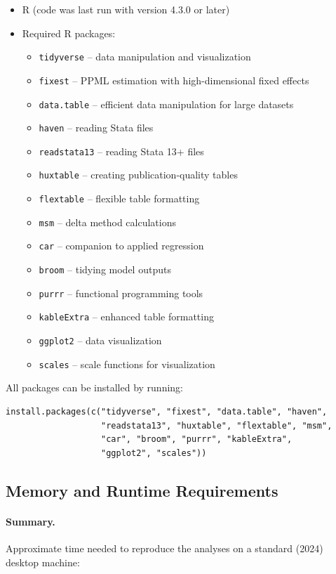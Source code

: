 \documentclass[12pt]{article}
\begin{document}
\begin{itemize}
	\item R (code was last run with version 4.3.0 or later)
	\item Required R packages:
	\begin{itemize}
		\item \texttt{tidyverse} -- data manipulation and visualization
		\item \texttt{fixest} -- PPML estimation with high-dimensional fixed effects
		\item \texttt{data.table} -- efficient data manipulation for large datasets
		\item \texttt{haven} -- reading Stata files
		\item \texttt{readstata13} -- reading Stata 13+ files
		\item \texttt{huxtable} -- creating publication-quality tables
		\item \texttt{flextable} -- flexible table formatting
		\item \texttt{msm} -- delta method calculations
		\item \texttt{car} -- companion to applied regression
		\item \texttt{broom} -- tidying model outputs
		\item \texttt{purrr} -- functional programming tools
		\item \texttt{kableExtra} -- enhanced table formatting
		\item \texttt{ggplot2} -- data visualization
		\item \texttt{scales} -- scale functions for visualization
	\end{itemize}
\end{itemize}

All packages can be installed by running:
\begin{verbatim}
install.packages(c("tidyverse", "fixest", "data.table", "haven",
                   "readstata13", "huxtable", "flextable", "msm",
                   "car", "broom", "purrr", "kableExtra",
                   "ggplot2", "scales"))
\end{verbatim}

\subsection{Memory and Runtime Requirements}

\paragraph{Summary.} Approximate time needed to reproduce the analyses on a standard (2024) desktop machine:
\end{document}
